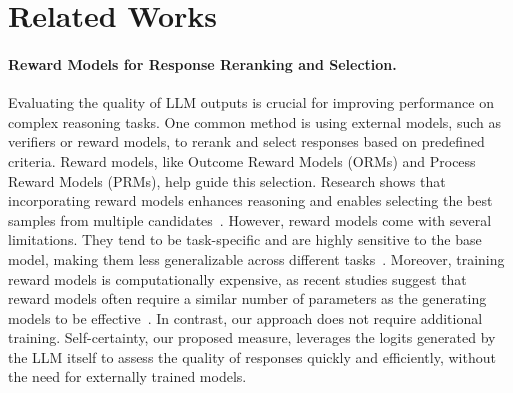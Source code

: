 


\section{Related Works}
\paragraph{Reward Models for Response Reranking and Selection.}
Evaluating the quality of LLM outputs is crucial for improving performance on complex reasoning tasks. One common method is using external models, such as verifiers or reward models, to rerank and select responses based on predefined criteria. Reward models, like Outcome Reward Models (ORMs) and Process Reward Models (PRMs), help guide this selection. Research shows that incorporating reward models enhances reasoning and enables selecting the best samples from multiple candidates~\citep{lightman2023let, wang2024math}. However, reward models come with several limitations. They tend to be task-specific and are highly sensitive to the base model, making them less generalizable across different tasks~\citep{eisenstein2023helping}. Moreover, training reward models is computationally expensive, as recent studies suggest that reward models often require a similar number of parameters as the generating models to be effective~\citep{wang2024math}. In contrast, our approach does not require additional training. Self-certainty, our proposed measure, leverages the logits generated by the LLM itself to assess the quality of responses quickly and efficiently, without the need for externally trained models.

